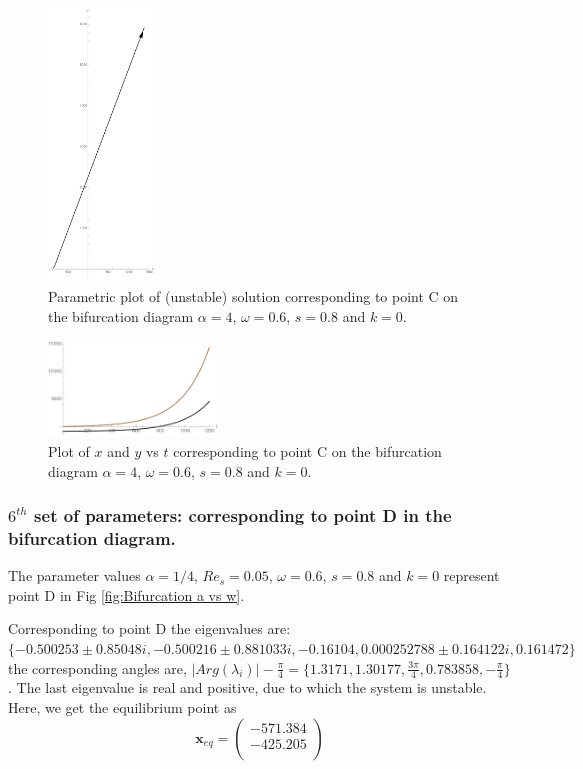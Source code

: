 \documentclass[pdflatex,sn-mathphys]{sn-jnl}%
\theoremstyle{thmstyleone}%
\theoremstyle{thmstyletwo}%
\theoremstyle{thmstylethree}%
\begin{document}
\begin{figure}
  \centering
    \includegraphics[width=0.25\textwidth]{Fig4Right(unstable)Parametric}
    \caption{Parametric plot of (unstable) solution corresponding to point C on the bifurcation diagram $\alpha = 4$, $\omega = 0.6$, $s=0.8$ and $k=0$.}
    \label{fig:Unstable parametric case corresponding to point C on bifurcation diagram}   
\end{figure}
\begin{figure}[h]%
\centering
    \includegraphics[width=0.4\textwidth]{Fig4right(unstable)plot}
    \caption{Plot of $x$ and $y$ vs $t$ corresponding to point C on the bifurcation diagram $\alpha = 4$, $\omega = 0.6$, $s=0.8$ and $k=0$.}
    \label{fig:Unstable Plot case corresponding to point C on bifurcation diagram}
\end{figure}

\subsubsection{$6^{th}$ set of parameters: corresponding to point D in the bifurcation diagram.}\label{$6{th}$ set}
The parameter values $\alpha = 1/4$, $Re_{s}=0.05$, $\omega=0.6$, $s=0.8$ and $k=0$ represent point D in Fig \ref{fig:Bifurcation a vs w}.

Corresponding to point D the eigenvalues are: $\{ -0.500253 \pm 0.85048i,  -0.500216 \pm 0.881033i,  -0.16104, 0.000252788 \pm 0.164122i, 0.161472 \}$
the corresponding angles are,
$\vert Arg(\lambda_{i})\vert -\frac{\pi}{4}=\{1.3171, 1.30177,\frac{3\pi}{4},0.783858,-\frac{\pi}{4}\}$. The last eigenvalue is real and positive, due to which the system is unstable.
Here, we get the equilibrium point as
$$\mathbf{x}_{eq}=
\left(
\begin{array}{c}
 -571.384 \\
-425.205 \\
\end{array}
\right)$$
\end{document}
